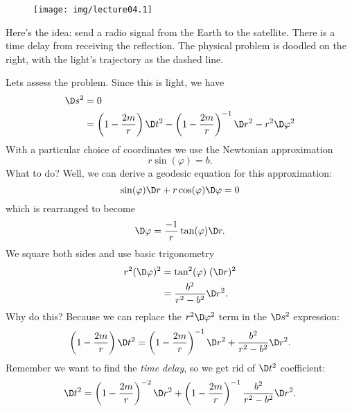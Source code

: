 \begin{wrapfigure}{r}{10pc}
  \vspace{-1pc}
  \texttt{[image: img/lecture04.1]}
  \vspace{-3pc}
\end{wrapfigure}

Here's the idea: send a radio signal from the Earth to the
satellite. There is a time delay from receiving the reflection.
The physical problem is doodled on the right, with the light's
trajectory as the dashed line.

Lets assess the problem. Since this is light, we have
\begin{equation}
\begin{split}
\D s^{2} &= 0\\
&= \left(1-\frac{2m}{r}\right)\D t^{2}
-\left(1-\frac{2m}{r}\right)^{-1}\D r^{2}
-r^{2}\D\varphi^{2}
\end{split}
\end{equation}
With a particular choice of coordinates we use the Newtonian approximation
\begin{equation}
r\sin(\varphi)=b.
\end{equation}
What to do? Well, we can derive a geodesic equation for this
approximation:
\begin{equation}
\sin(\varphi)\D r+r\cos(\varphi)\D\varphi=0
\end{equation}
which is rearranged to become
\begin{equation}
\D\varphi=\frac{-1}{r}\tan(\varphi)\D r.
\end{equation}
We square both sides and use basic trigonometry
\begin{equation}
\begin{split}
r^{2}(\D\varphi)^{2}&=\tan^{2}(\varphi)\;(\D r)^{2}\\
&=\frac{b^{2}}{r^{2}-b^{2}}\D r^{2}.
\end{split}
\end{equation}
Why do this? Because we can replace the $r^{2}\D\varphi^{2}$ term
in the $\D s^{2}$ expression:
\begin{equation}
\left(1-\frac{2m}{r}\right)\D t^{2}
=
\left(1-\frac{2m}{r}\right)^{-1}\D r^{2}
+\frac{b^{2}}{r^{2}-b^{2}}\D r^{2}.
\end{equation}
Remember we want to find the \emph{time delay}, so we get rid of
$\D t^{2}$ coefficient:
\begin{equation}
\D t^{2}=\left(1-\frac{2m}{r}\right)^{-2}\D r^{2}
+\left(1-\frac{2m}{r}\right)^{-1}\frac{b^{2}}{r^{2}-b^{2}}\D r^{2}.
\end{equation}
